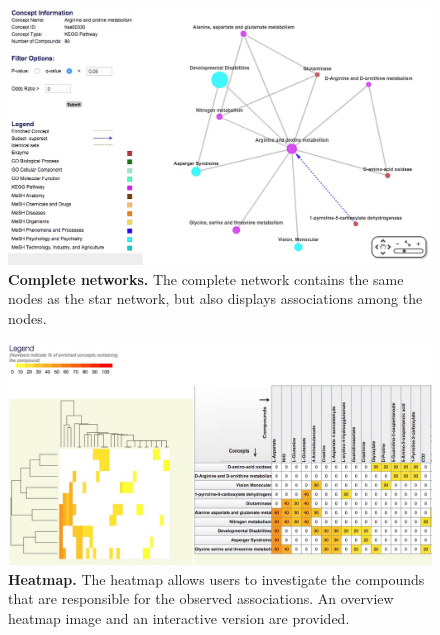 \newpage

\begin{figure}[ht!]
\centering
\includegraphics[width=1\textwidth]{chap3figs/figure3_7.jpg}
\caption[Complete networks.]
{
\textbf{Complete networks.} The complete network contains the same nodes as the star network, but also displays associations among the nodes.
}
\label{chap3:fig:7}
\end{figure}

\newpage

\begin{figure}[ht!]
\centering
\includegraphics[width=1\textwidth]{chap3figs/figure3_8.jpg}
\caption[Heatmap.]
{
\textbf{Heatmap.} The heatmap allows users to investigate the compounds that are responsible for the observed associations. An overview heatmap image and an interactive version are provided.
}
\label{chap3:fig:8}
\end{figure}

